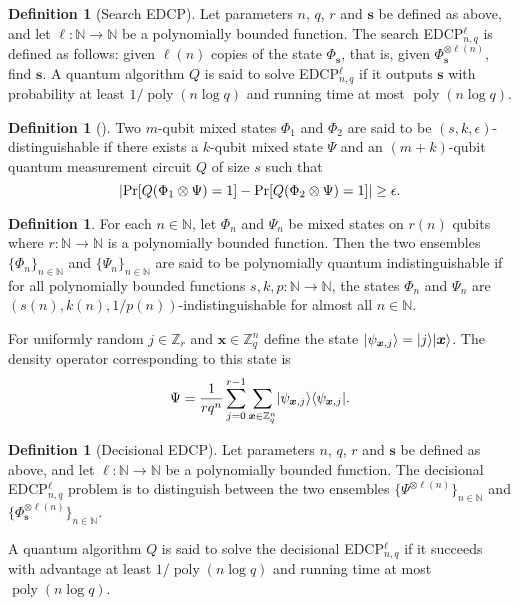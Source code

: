 \documentclass[11pt]{article}
\theoremstyle{plain}
\theoremstyle{definition}
\newtheorem{definition}[theorem]{Definition}
\DeclareMathOperator{\poly}{poly}
\DeclarePairedDelimiter{\abs}{\lvert}{\rvert}
\DeclarePairedDelimiter{\ldbrac}{\lvert}{\rangle}
\DeclarePairedDelimiter{\rdbrac}{\langle}{\rvert}
\def\N{\ensuremath{\mathbb{N}}}
\def\Z{\ensuremath{\mathbb{Z}}}
\begin{document}
\begin{definition}[Search EDCP]
    Let parameters $n$, $q$, $r$ and $\bm{s}$ be defined as above, and let $\ell: \N \rightarrow \N$ be a polynomially bounded function. The search EDCP$_{n, q}^\ell$ is defined as follows: given $\ell(n)$ copies of the state $\Phi_{\bm{s}}$, that is, given $\Phi_{\bm{s}}^{\otimes \ell(n)}$, find $\bm{s}$. A quantum algorithm $Q$ is said to solve EDCP$_{n, q}^\ell$ if it outputs $\bm{s}$ with probability at least $1 / \poly(n\log q)$ and running time at most $\poly(n\log q)$.
\end{definition}
\begin{definition}[\cite{watrous2009zero}]
    Two $m$-qubit mixed states $\Phi_1$ and $\Phi_2$ are said to be $(s, k, \epsilon)$-distinguishable if there exists a $k$-qubit mixed state $\Psi$ and an $(m + k)$-qubit quantum measurement circuit $Q$ of size $s$ such that
    \[ \abs{ \Pr[Q(\Phi_1 \otimes \Psi) = 1] - \Pr[Q(\Phi_2 \otimes \Psi) = 1] } \ge \epsilon. \]
\end{definition}
\begin{definition}
    For each $n \in \N$, let $\Phi_n$ and $\Psi_n$ be mixed states on $r(n)$ qubits where $r: \N \rightarrow \N$ is a polynomially bounded function. Then the two ensembles $\{ \Phi_n \}_{n \in \N}$ and $\{ \Psi_n \}_{n \in \N}$ are said to be polynomially quantum indistinguishable if for all polynomially bounded functions $s, k, p: \N \rightarrow \N$, the states $\Phi_n$ and $\Psi_n$ are $(s(n), k(n), 1 / p(n))$-indistinguishable for almost all $n \in \N$.
\end{definition}
For uniformly random $j \in \Z_r$ and $\bm{x} \in \Z_q^n$ define the state $\ldbrac{\psi_{\bm{x}, j}} = \ldbrac{j}\ldbrac{\bm{x}}$. The density operator corresponding to this state is
\[ \Psi = \frac{1}{rq^n} \sum_{j = 0}^{r - 1} \sum_{\bm{x} \in \Z_q^n} \ldbrac{\psi_{\bm{x}, j}} \rdbrac{\psi_{\bm{x}, j}}. \]
\begin{definition}[Decisional EDCP]
    Let parameters $n$, $q$, $r$ and $\bm{s}$ be defined as above, and let $\ell: \N \rightarrow \N$ be a polynomially bounded function. The decisional EDCP$_{n, q}^\ell$ problem is to distinguish between the two ensembles $\{ \Psi^{\otimes \ell(n)} \}_{n \in \N}$ and $\{ \Phi_{\bm{s}}^{\otimes \ell(n)} \}_{n \in \N}$.
\end{definition}
A quantum algorithm $Q$ is said to solve the decisional EDCP$_{n, q}^\ell$ if it succeeds with advantage at least $1 / \poly(n\log q)$ and running time at most $\poly(n\log q)$. 
\end{document}
